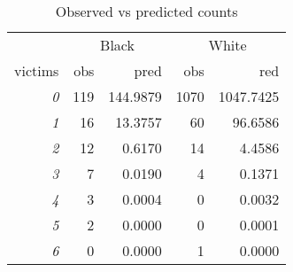 \begin{wraptable}{r}{4in}

\caption{\label{tab:obs_vs_pred}Observed vs predicted counts}
\centering
\fontsize{9}{11}\selectfont
\begin{tabular}[t]{>{}rrrrr}
\toprule
\multicolumn{1}{c}{ } & \multicolumn{2}{c}{Black} & \multicolumn{2}{c}{White} \\
\cmidrule(l{3pt}r{3pt}){2-3} \cmidrule(l{3pt}r{3pt}){4-5}
victims & obs & pred & obs & red\\
\midrule
\em{0} & 119 & 144.9879 & 1070 & 1047.7425\\
\em{1} & 16 & 13.3757 & 60 & 96.6586\\
\em{2} & 12 & 0.6170 & 14 & 4.4586\\
\em{3} & 7 & 0.0190 & 4 & 0.1371\\
\em{4} & 3 & 0.0004 & 0 & 0.0032\\
\addlinespace
\em{5} & 2 & 0.0000 & 0 & 0.0001\\
\em{6} & 0 & 0.0000 & 1 & 0.0000\\
\bottomrule
\end{tabular}
\end{wraptable}
